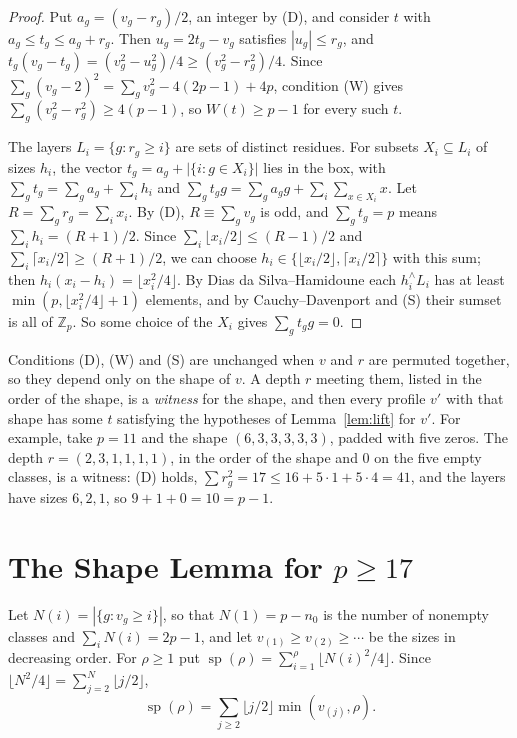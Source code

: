 \documentclass[11pt]{article}
\theoremstyle{remark}
\newcommand{\Z}{\mathbb{Z}}
\begin{document}
\begin{proof}
Put $a_g=(v_g-r_g)/2$, an integer by (D), and consider $t$ with $a_g\le t_g\le a_g+r_g$. Then $u_g=2t_g-v_g$ satisfies $|u_g|\le r_g$, and $t_g(v_g-t_g)=(v_g^2-u_g^2)/4\ge(v_g^2-r_g^2)/4$. Since $\sum_g(v_g-2)^2=\sum_g v_g^2-4(2p-1)+4p$, condition (W) gives $\sum_g(v_g^2-r_g^2)\ge4(p-1)$, so $W(t)\ge p-1$ for every such $t$.

The layers $L_i=\{g:r_g\ge i\}$ are sets of distinct residues. For subsets $X_i\subseteq L_i$ of sizes $h_i$, the vector $t_g=a_g+|\{i:g\in X_i\}|$ lies in the box, with $\sum_g t_g=\sum_g a_g+\sum_i h_i$ and $\sum_g t_g g=\sum_g a_g g+\sum_i\sum_{x\in X_i}x$. Let $R=\sum_g r_g=\sum_i x_i$. By (D), $R\equiv\sum_g v_g$ is odd, and $\sum_g t_g=p$ means $\sum_i h_i=(R+1)/2$. Since $\sum_i\lfloor x_i/2\rfloor\le(R-1)/2$ and $\sum_i\lceil x_i/2\rceil\ge(R+1)/2$, we can choose $h_i\in\{\lfloor x_i/2\rfloor,\lceil x_i/2\rceil\}$ with this sum; then $h_i(x_i-h_i)=\lfloor x_i^2/4\rfloor$. By Dias da Silva--Hamidoune each $h_i^\wedge L_i$ has at least $\min(p,\lfloor x_i^2/4\rfloor+1)$ elements, and by Cauchy--Davenport and (S) their sumset is all of $\Z_p$. So some choice of the $X_i$ gives $\sum_g t_g g=0$.
\end{proof}

Conditions (D), (W) and (S) are unchanged when $v$ and $r$ are permuted together, so they depend only on the shape of $v$. A depth $r$ meeting them, listed in the order of the shape, is a \emph{witness} for the shape, and then every profile $v'$ with that shape has some $t$ satisfying the hypotheses of Lemma~\ref{lem:lift} for $v'$. For example, take $p=11$ and the shape $(6,3,3,3,3,3)$, padded with five zeros. The depth $r=(2,3,1,1,1,1)$, in the order of the shape and $0$ on the five empty classes, is a witness: (D) holds, $\sum r_g^2=17\le 16+5\cdot1+5\cdot4=41$, and the layers have sizes $6,2,1$, so $9+1+0=10=p-1$.

\section{The Shape Lemma for \texorpdfstring{$p\ge17$}{p >= 17}}\label{sec:shape}

Let $N(i)=|\{g:v_g\ge i\}|$, so that $N(1)=p-n_0$ is the number of nonempty classes and $\sum_i N(i)=2p-1$, and let $v_{(1)}\ge v_{(2)}\ge\cdots$ be the sizes in decreasing order. For $\rho\ge1$ put $\operatorname{sp}(\rho)=\sum_{i=1}^{\rho}\lfloor N(i)^2/4\rfloor$. Since $\lfloor N^2/4\rfloor=\sum_{j=2}^{N}\lfloor j/2\rfloor$,
\begin{equation}\label{eq:spread}
\operatorname{sp}(\rho)=\sum_{j\ge2}\lfloor j/2\rfloor\min(v_{(j)},\rho).
\end{equation}
\end{document}
